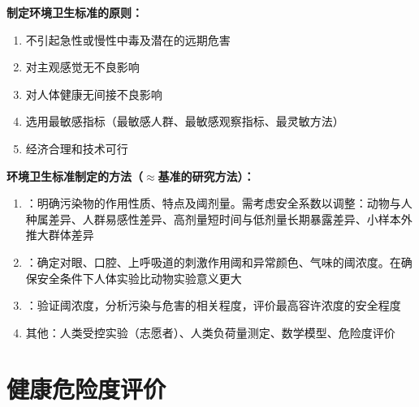 \textbf{制定环境卫生标准的原则：}
\begin{enumerate}[leftmargin=*]
    \item 不引起急性或慢性中毒及潜在的远期危害
    \item 对主观感觉无不良影响
    \item 对人体健康无间接不良影响
    \item 选用最敏感指标（最敏感人群、最敏感观察指标、最灵敏方法）
    \item 经济合理和技术可行
\end{enumerate}

\begin{tipbox}
\textbf{环境卫生标准制定的方法（$\approx$基准的研究方法）：}
\begin{enumerate}[leftmargin=*]
    \item {}：明确污染物的作用性质、特点及阈剂量。需考虑安全系数以调整：动物与人种属差异、人群易感性差异、高剂量短时间与低剂量长期暴露差异、小样本外推大群体差异
    \item {}：确定对眼、口腔、上呼吸道的刺激作用阈和异常颜色、气味的阈浓度。在确保安全条件下人体实验比动物实验意义更大
    \item {}：验证阈浓度，分析污染与危害的相关程度，评价最高容许浓度的安全程度
    \item 其他：人类受控实验（志愿者）、人类负荷量测定、数学模型、危险度评价
\end{enumerate}
\end{tipbox}

\section{健康危险度评价}

